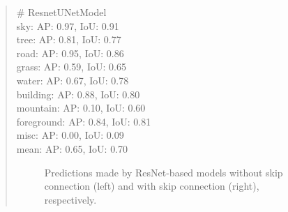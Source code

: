 \documentclass[11pt]{article}
\begin{document}
\begin{quote}
{\# ResnetUNetModel \\
sky: AP: 0.97, IoU: 0.91 \\
tree: AP: 0.81, IoU: 0.77 \\
road: AP: 0.95, IoU: 0.86 \\
grass: AP: 0.59, IoU: 0.65 \\
water: AP: 0.67, IoU: 0.78 \\
building: AP: 0.88, IoU: 0.80 \\
mountain: AP: 0.10, IoU: 0.60 \\
foreground: AP: 0.84, IoU: 0.81 \\
misc: AP: 0.00, IoU: 0.09 \\
mean: AP: 0.65, IoU: 0.70 \\
}

\begin{figure}[h]
    \centering
    \qquad
    \caption{Predictions made by ResNet-based models without skip connection (left) and with skip connection (right), respectively.}
    \label{fig:pred-ResnetBasedModel}
\end{figure}

\end{quote}
\end{document}
